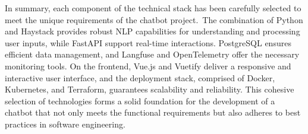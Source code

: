 In summary, each component of the technical stack has been carefully selected to meet the unique requirements of the
chatbot project.\ The combination of Python and Haystack provides robust \acs{NLP} capabilities for understanding and
processing user inputs, while FastAPI support real-time interactions. PostgreSQL ensures efficient data management,
and Langfuse and OpenTelemetry offer the necessary monitoring tools. On the frontend, Vue.js and Vuetify deliver a
responsive and interactive user interface, and the deployment stack, comprised of Docker, Kubernetes, and Terraform,
guarantees scalability and reliability. This cohesive selection of technologies forms a solid foundation for the
development of a chatbot that not only meets the functional requirements but also adheres to best practices in software
engineering.
